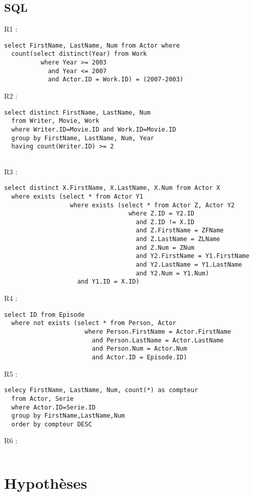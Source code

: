 \documentclass[a4paper,12pt]{article}
\begin{document}
\subsection{SQL}
\begin{list}{-}{}
  \item R1 :
    \begin{lstlisting}
select FirstName, LastName, Num from Actor where
  count(select distinct(Year) from Work
          where Year >= 2003 
            and Year <= 2007
            and Actor.ID = Work.ID) = (2007-2003)

    \end{lstlisting}
  \item R2 :
    \begin{lstlisting}
select distinct FirstName, LastName, Num
  from Writer, Movie, Work
  where Writer.ID=Movie.ID and Work.ID=Movie.ID
  group by FirstName, LastName, Num, Year
  having count(Writer.ID) >= 2
    
    \end{lstlisting}
  \item R3 :
    \begin{lstlisting}
select distinct X.FirstName, X.LastName, X.Num from Actor X
  where exists (select * from Actor Y1
                  where exists (select * from Actor Z, Actor Y2 
                                  where Z.ID = Y2.ID
                                    and Z.ID != X.ID
                                    and Z.FirstName = ZFName
                                    and Z.LastName = ZLName
                                    and Z.Num = ZNum
                                    and Y2.FirstName = Y1.FirstName
                                    and Y2.LastName = Y1.LastName
                                    and Y2.Num = Y1.Num)
                    and Y1.ID = X.ID)
    \end{lstlisting}
  \item R4 :
    \begin{lstlisting}
select ID from Episode
  where not exists (select * from Person, Actor
                      where Person.FirstName = Actor.FirstName
                        and Person.LastName = Actor.LastName
                        and Person.Num = Actor.Num
                        and Actor.ID = Episode.ID)
    \end{lstlisting}
  \item R5 :
    \begin{lstlisting}
selecy FirstName, LastName, Num, count(*) as compteur
  from Actor, Serie
  where Actor.ID=Serie.ID
  group by FirstName,LastName,Num
  order by compteur DESC
    \end{lstlisting}
  \item R6 :
    \begin{lstlisting}
    \end{lstlisting}
\section{Hypothèses}
\end{list}
\end{document}
